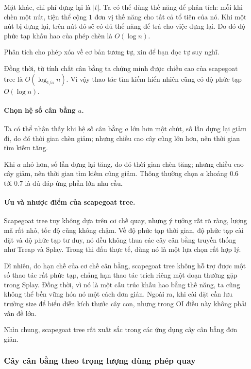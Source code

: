 \documentclass[11pt]{article}
\begin{document}
Mặt khác, chi phí dựng lại là \(|t|\). Ta có thể dùng thế năng để phân tích:
mỗi khi chèn một nút, tiện thể cộng \(1\) đơn vị thế năng cho tất cả tổ tiên
của nó. Khi một nút bị dựng lại, trên nút đó sẽ có đủ thế năng để trả cho
việc dựng lại. Do đó độ phức tạp khấu hao của phép chèn là \(O(\log n)\).

Phân tích cho phép xóa về cơ bản tương tự, xin để bạn đọc tự suy nghĩ.

Đồng thời, từ tính chất cân bằng ta chứng minh được chiều cao của scapegoat
tree là \(O(\log_{1/a} n)\). Vì vậy thao tác tìm kiếm hiển nhiên cũng có độ
phức tạp \(O(\log n)\).

\paragraph{Chọn hệ số cân bằng \(a\).}
Ta có thể nhận thấy khi hệ số cân bằng \(a\) lớn hơn một chút, số lần dựng
lại giảm đi, do đó thời gian chèn giảm; nhưng chiều cao cây cũng lớn hơn,
nên thời gian tìm kiếm tăng.

Khi \(a\) nhỏ hơn, số lần dựng lại tăng, do đó thời gian chèn tăng; nhưng
chiều cao cây giảm, nên thời gian tìm kiếm cũng giảm. Thông thường chọn
\(a\) khoảng \(0.6\) tới \(0.7\) là đủ đáp ứng phần lớn nhu cầu.

\paragraph{Ưu và nhược điểm của scapegoat tree.}
Scapegoat tree tuy không dựa trên cơ chế quay, nhưng ý tưởng rất rõ ràng,
lượng mã rất nhỏ, tốc độ cũng không chậm. Về độ phức tạp thời gian, độ phức
tạp cài đặt và độ phức tạp tư duy, nó đều không thua các cây cân bằng truyền
thống như Treap và Splay. Trong thi đấu thực tế, dùng nó là một lựa chọn rất
hợp lý.

Dĩ nhiên, do hạn chế của cơ chế cân bằng, scapegoat tree không hỗ trợ được
một số thao tác rất phức tạp, chẳng hạn thao tác trích riêng một đoạn thường
gặp trong Splay. Đồng thời, vì nó là một cấu trúc khấu hao bằng thế năng, ta
cũng không thể bền vững hóa nó một cách đơn giản. Ngoài ra, khi cài đặt cần
lưu trường \(\mathrm{size}\) để biểu diễn kích thước cây con, nhưng trong OI
điều này không phải vấn đề lớn.

Nhìn chung, scapegoat tree rất xuất sắc trong các ứng dụng cây cân bằng đơn
giản.

\subsubsection{Cây cân bằng theo trọng lượng dùng phép quay}
\end{document}
